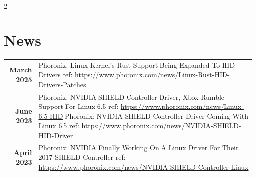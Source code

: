 \documentclass[lighthipster]{simplehipstercv}
\begin{document}
\begin{paracol}{2}
\section*{News}
\begin{tabular}{>{\footnotesize\bfseries}r >{\footnotesize}p{}}
    March 2025 & Phoronix: Linux Kernel's Rust Support Being Expanded To HID Drivers \newline ref: \href{https://www.phoronix.com/news/Linux-Rust-HID-Drivers-Patches}{https://www.phoronix.com/news/Linux-Rust-HID-Drivers-Patches} \\
    June 2023 & Phoronix: NVIDIA SHIELD Controller Driver, Xbox Rumble Support For Linux 6.5 \newline ref: \href{https://www.phoronix.com/news/Linux-6.5-HID}{https://www.phoronix.com/news/Linux-6.5-HID} \newline
                Phoronix: NVIDIA SHIELD Controller Driver Coming With Linux 6.5 \newline ref: \href{https://www.phoronix.com/news/NVIDIA-SHIELD-HID-Driver}{https://www.phoronix.com/news/NVIDIA-SHIELD-HID-Driver} \\
    April 2023 & Phoronix: NVIDIA Finally Working On A Linux Driver For Their 2017 SHIELD Controller \newline ref: \href{https://www.phoronix.com/news/NVIDIA-SHIELD-Controller-Linux}{https://www.phoronix.com/news/NVIDIA-SHIELD-Controller-Linux}
\end{tabular}
\bigskip

\bigskip

\hfill
\begin{minipage}[t]{0.3\textwidth}

\bigskip

\end{minipage}
\end{paracol}
\end{document}
